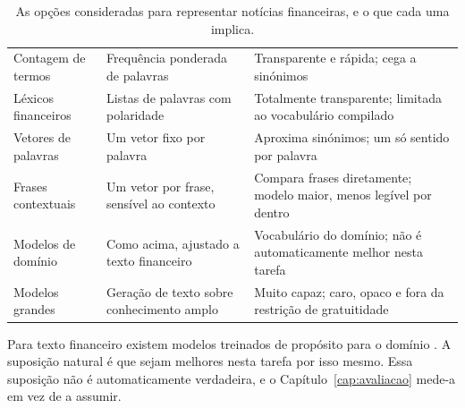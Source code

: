 \begin{table}[ht]
\caption[Abordagens de representação de texto]{As opções consideradas para representar notícias
financeiras, e o que cada uma implica.}
\label{tab:ctx_texto}
\centering
\small
\begin{tabular}{L{0.22\textwidth} L{0.28\textwidth} L{0.36\textwidth}}
\toprule
{} &  &  \\
\midrule
Contagem de termos \newline \autocite{salton1975vsm, robertson2009bm25}
  & Frequência ponderada de palavras
  & Transparente e rápida; cega a sinónimos \\
\addlinespace
Léxicos financeiros \newline \autocite{loughran2011liability}
  & Listas de palavras com polaridade
  & Totalmente transparente; limitada ao vocabulário compilado \\
\addlinespace
Vetores de palavras \newline \autocite{mikolov2013word2vec, pennington2014glove}
  & Um vetor fixo por palavra
  & Aproxima sinónimos; um só sentido por palavra \\
\addlinespace
Frases contextuais \newline \autocite{devlin2019bert, reimers2019sbert}
  & Um vetor por frase, sensível ao contexto
  & Compara frases diretamente; modelo maior, menos legível por dentro \\
\addlinespace
Modelos de domínio \newline \autocite{liu2020finbert, huang2023finbert}
  & Como acima, ajustado a texto financeiro
  & Vocabulário do domínio; não é automaticamente melhor nesta tarefa \\
\addlinespace
Modelos grandes \newline \autocite{wu2023bloomberggpt}
  & Geração de texto sobre conhecimento amplo
  & Muito capaz; caro, opaco e fora da restrição de gratuitidade \\
\bottomrule
\end{tabular}
\end{table}

Para texto financeiro existem modelos treinados de propósito para o domínio
\autocite{liu2020finbert, huang2023finbert}. A suposição natural é que sejam melhores nesta
tarefa por isso mesmo.
Essa suposição não é automaticamente verdadeira, e o Capítulo~\ref{cap:avaliacao} mede-a em vez de a
assumir.

